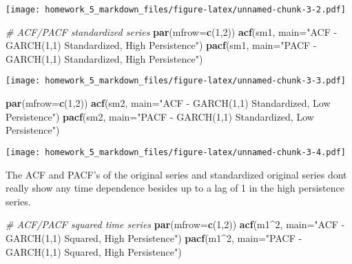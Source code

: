 \documentclass[]{article}
\newenvironment{Shaded}{\begin{snugshade}}{\end{snugshade}}
\newcommand{\KeywordTok}[1]{\textcolor[rgb]{0.13,0.29,0.53}{\textbf{#1}}}
\newcommand{\DataTypeTok}[1]{\textcolor[rgb]{0.13,0.29,0.53}{#1}}
\newcommand{\DecValTok}[1]{\textcolor[rgb]{0.00,0.00,0.81}{#1}}
\newcommand{\StringTok}[1]{\textcolor[rgb]{0.31,0.60,0.02}{#1}}
\newcommand{\CommentTok}[1]{\textcolor[rgb]{0.56,0.35,0.01}{\textit{#1}}}
\newcommand{\OperatorTok}[1]{\textcolor[rgb]{0.81,0.36,0.00}{\textbf{#1}}}
\newcommand{\NormalTok}[1]{#1}
\begin{document}
\texttt{[image: homework\_5\_markdown\_files/figure-latex/unnamed-chunk-3-2.pdf]}

\begin{Shaded}
\begin{Highlighting}[]
\CommentTok{# ACF/PACF standardized series}
\KeywordTok{par}\NormalTok{(}\DataTypeTok{mfrow=}\KeywordTok{c}\NormalTok{(}\DecValTok{1}\NormalTok{,}\DecValTok{2}\NormalTok{))}
\KeywordTok{acf}\NormalTok{(sm1, }\DataTypeTok{main=}\StringTok{"ACF - GARCH(1,1) Standardized, High Persistence"}\NormalTok{)}
\KeywordTok{pacf}\NormalTok{(sm1, }\DataTypeTok{main=}\StringTok{"PACF - GARCH(1,1) Standardized, High Persistence"}\NormalTok{)}
\end{Highlighting}
\end{Shaded}

\texttt{[image: homework\_5\_markdown\_files/figure-latex/unnamed-chunk-3-3.pdf]}

\begin{Shaded}
\begin{Highlighting}[]
\KeywordTok{par}\NormalTok{(}\DataTypeTok{mfrow=}\KeywordTok{c}\NormalTok{(}\DecValTok{1}\NormalTok{,}\DecValTok{2}\NormalTok{))}
\KeywordTok{acf}\NormalTok{(sm2, }\DataTypeTok{main=}\StringTok{"ACF - GARCH(1,1) Standardized, Low Persistence"}\NormalTok{)}
\KeywordTok{pacf}\NormalTok{(sm2, }\DataTypeTok{main=}\StringTok{"PACF - GARCH(1,1) Standardized, Low Persistence"}\NormalTok{)}
\end{Highlighting}
\end{Shaded}

\texttt{[image: homework\_5\_markdown\_files/figure-latex/unnamed-chunk-3-4.pdf]}

The ACF and PACF's of the original series and standardized original
series dont really show any time dependence besides up to a lag of 1 in
the high persistence series.

\begin{Shaded}
\begin{Highlighting}[]
\CommentTok{# ACF/PACF squared time series}
\KeywordTok{par}\NormalTok{(}\DataTypeTok{mfrow=}\KeywordTok{c}\NormalTok{(}\DecValTok{1}\NormalTok{,}\DecValTok{2}\NormalTok{))}
\KeywordTok{acf}\NormalTok{(m1}\OperatorTok{^}\DecValTok{2}\NormalTok{, }\DataTypeTok{main=}\StringTok{"ACF - GARCH(1,1) Squared, High Persistence"}\NormalTok{)}
\KeywordTok{pacf}\NormalTok{(m1}\OperatorTok{^}\DecValTok{2}\NormalTok{, }\DataTypeTok{main=}\StringTok{"PACF - GARCH(1,1) Squared, High Persistence"}\NormalTok{)}
\end{Highlighting}
\end{Shaded}
\end{document}
